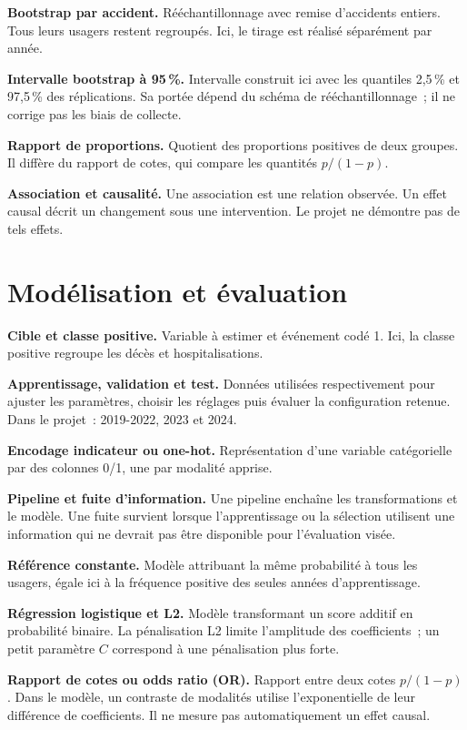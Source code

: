 \textbf{Bootstrap par accident.} Rééchantillonnage avec remise d'accidents entiers.
Tous leurs usagers restent regroupés. Ici, le tirage est réalisé séparément par année.

\textbf{Intervalle bootstrap à 95\,\%.} Intervalle construit ici avec les quantiles
2,5\,\% et 97,5\,\% des réplications. Sa portée dépend du schéma de rééchantillonnage~;
il ne corrige pas les biais de collecte.

\textbf{Rapport de proportions.} Quotient des proportions positives de deux groupes.
Il diffère du rapport de cotes, qui compare les quantités $p/(1-p)$.

\begin{samepage}
\textbf{Association et causalité.} Une association est une relation observée. Un effet
causal décrit un changement sous une intervention. Le projet ne démontre pas de tels effets.
\par\end{samepage}

\section*{Modélisation et évaluation}
\textbf{Cible et classe positive.} Variable à estimer et événement codé 1.
Ici, la classe positive regroupe les décès et hospitalisations.

\textbf{Apprentissage, validation et test.} Données utilisées respectivement pour
ajuster les paramètres, choisir les réglages puis évaluer la configuration retenue.
Dans le projet~: 2019-2022, 2023 et 2024.

\textbf{Encodage indicateur ou one-hot.} Représentation d'une variable catégorielle
par des colonnes 0/1, une par modalité apprise.

\textbf{Pipeline et fuite d'information.} Une pipeline enchaîne les transformations
et le modèle. Une fuite survient lorsque l'apprentissage ou la sélection utilisent
une information qui ne devrait pas être disponible pour l'évaluation visée.

\textbf{Référence constante.} Modèle attribuant la même probabilité à tous les usagers,
égale ici à la fréquence positive des seules années d'apprentissage.

\textbf{Régression logistique et L2.} Modèle transformant un score additif en
probabilité binaire. La pénalisation L2 limite l'amplitude des coefficients~;
un petit paramètre $C$ correspond à une pénalisation plus forte.

\textbf{Rapport de cotes ou odds ratio (OR).} Rapport entre deux cotes $p/(1-p)$.
Dans le modèle, un contraste de modalités utilise l'exponentielle de leur différence
de coefficients. Il ne mesure pas automatiquement un effet causal.

